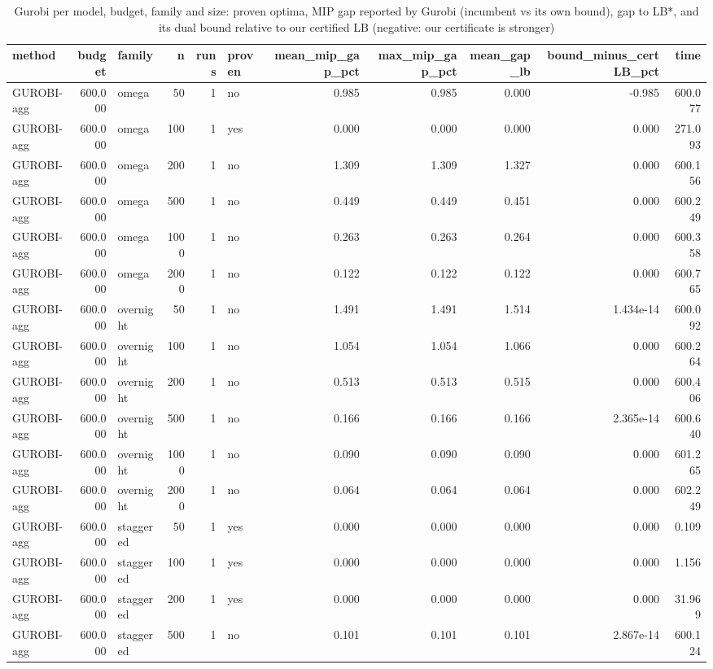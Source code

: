\begin{table}[htbp]
\centering
\small
\caption{Gurobi per model, budget, family and size: proven optima, MIP gap reported by Gurobi (incumbent vs its own bound), gap to LB*, and its dual bound relative to our certified LB (negative: our certificate is stronger)}
\label{tab:E3_long_runs_gurobi}
\begin{tabular}{lrlrrlrrrrr}
\toprule
method & budget & family & n & runs & proven & mean\_mip\_gap\_pct & max\_mip\_gap\_pct & mean\_gap\_lb & bound\_minus\_certLB\_pct & time \\
\midrule
GUROBI-agg & 600.000 & omega & 50 & 1 & no & 0.985 & 0.985 & 0.000 & -0.985 & 600.077 \\
GUROBI-agg & 600.000 & omega & 100 & 1 & yes & 0.000 & 0.000 & 0.000 & 0.000 & 271.093 \\
GUROBI-agg & 600.000 & omega & 200 & 1 & no & 1.309 & 1.309 & 1.327 & 0.000 & 600.156 \\
GUROBI-agg & 600.000 & omega & 500 & 1 & no & 0.449 & 0.449 & 0.451 & 0.000 & 600.249 \\
GUROBI-agg & 600.000 & omega & 1000 & 1 & no & 0.263 & 0.263 & 0.264 & 0.000 & 600.358 \\
GUROBI-agg & 600.000 & omega & 2000 & 1 & no & 0.122 & 0.122 & 0.122 & 0.000 & 600.765 \\
GUROBI-agg & 600.000 & overnight & 50 & 1 & no & 1.491 & 1.491 & 1.514 & 1.434e-14 & 600.092 \\
GUROBI-agg & 600.000 & overnight & 100 & 1 & no & 1.054 & 1.054 & 1.066 & 0.000 & 600.264 \\
GUROBI-agg & 600.000 & overnight & 200 & 1 & no & 0.513 & 0.513 & 0.515 & 0.000 & 600.406 \\
GUROBI-agg & 600.000 & overnight & 500 & 1 & no & 0.166 & 0.166 & 0.166 & 2.365e-14 & 600.640 \\
GUROBI-agg & 600.000 & overnight & 1000 & 1 & no & 0.090 & 0.090 & 0.090 & 0.000 & 601.265 \\
GUROBI-agg & 600.000 & overnight & 2000 & 1 & no & 0.064 & 0.064 & 0.064 & 0.000 & 602.249 \\
GUROBI-agg & 600.000 & staggered & 50 & 1 & yes & 0.000 & 0.000 & 0.000 & 0.000 & 0.109 \\
GUROBI-agg & 600.000 & staggered & 100 & 1 & yes & 0.000 & 0.000 & 0.000 & 0.000 & 1.156 \\
GUROBI-agg & 600.000 & staggered & 200 & 1 & yes & 0.000 & 0.000 & 0.000 & 0.000 & 31.969 \\
GUROBI-agg & 600.000 & staggered & 500 & 1 & no & 0.101 & 0.101 & 0.101 & 2.867e-14 & 600.124 \\

\end{tabular}
\end{table}
